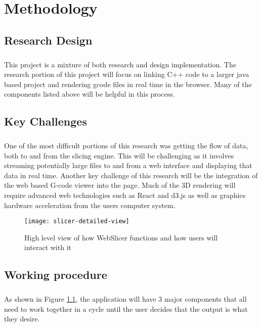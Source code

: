 \chapter{Methodology}

\section{Research Design} 
\paragraph{}
This project is a mixture of both research and design implementation.
The research portion of this project will focus on linking C++ code to a larger java based project and rendering gcode files in real time in the browser.
Many of the components listed above will be helpful in this process.

\section{Key Challenges} 
\paragraph{}
One of the most difficult portions of this research was getting the flow of data, both to and from the slicing engine.
This will be challenging as it involves streaming potentially large files to and from a web interface and displaying that data in real time.
Another key challenge of this research will be the integration of the web based G-code viewer into the page. 
Much of the 3D rendering will require advanced web technologies such as React and d3.js as well as graphics hardware acceleration from the users computer system.

\begin{figure}[!ht]
  \centering
  \texttt{[image: slicer-detailed-view]}
  \caption{High level view of how WebSlicer functions and how users will interact with it}
  \label{fig:slicer-detailed-view}
\end{figure}

\section{Working procedure}
\paragraph{}
As shown in Figure \ref{fig:slicer-detailed-view}, the application will have 3 major components that all need to work together in a cycle until the user decides that the output is what they desire.

